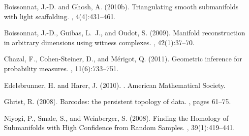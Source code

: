 % 
% 


\begin{thebibliography}{}
\vspace{-2mm}

{\footnotesize

Boissonnat, J.-D. and Ghosh, A. (2010b).
\newblock Triangulating smooth submanifolds with light scaffolding.
, 4(4):431--461.
\vspace{-2mm}

Boissonnat, J.-D., Guibas, L.~J., and Oudot, S. (2009).
\newblock Manifold reconstruction in arbitrary dimensions using witness
  complexes.
, 42(1):37--70.
\vspace{-2mm}

Chazal, F., Cohen-Steiner, D., and M\'erigot, Q. (2011).
\newblock Geometric inference for probability measures.
,
  11(6):733--751.
\vspace{-2mm}

Edelsbrunner, H. and Harer, J. (2010).
.
\newblock American Mathematical Society.
\vspace{-2mm}

Ghrist, R. (2008).
\newblock Barcodes: the persistent topology of data.
, pages 61--75.
\vspace{-2mm}

Niyogi, P., Smale, S., and Weinberger, S. (2008).
\newblock Finding the {H}omology of {S}ubmanifolds with {H}igh {C}onfidence
  from {R}andom {S}amples.
, 39(1):419--441.

}

\end{thebibliography}
